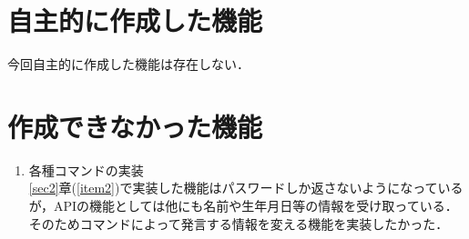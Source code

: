 \documentclass[12pt]{jsarticle}
\begin{document}
\section{自主的に作成した機能}\label{sec4}
今回自主的に作成した機能は存在しない．

\section{作成できなかった機能}\label{sec5}
\begin{enumerate}
\item 各種コマンドの実装\\
  \ref{sec2}章(\ref{item2})で実装した機能はパスワードしか返さないようになっているが，APIの機能としては他にも名前や生年月日等の情報を受け取っている．そのためコマンドによって発言する情報を変える機能を実装したかった．
\end{enumerate}


\end{document}
